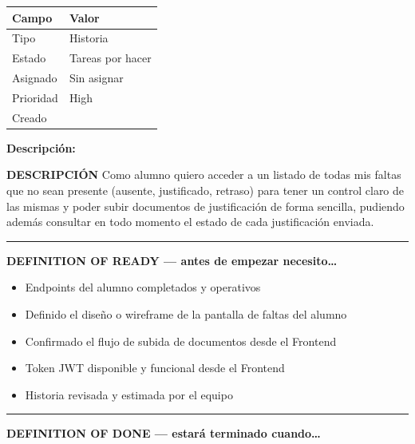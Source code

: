 \documentclass[
  spanish,
  11pt,
]{report}
\newcounter{none} %
\providecommand{\tightlist}{%
  \setlength{\itemsep}{0pt}\setlength{\parskip}{0pt}}
\begin{document}
{\def\LTcaptype{none} %
\begin{longtable}[]{@{}ll@{}}
\toprule\noalign{}
Campo & Valor \\
\midrule\noalign{}
\endhead
\bottomrule\noalign{}
\endlastfoot
Tipo & Historia \\
Estado & Tareas por hacer \\
Asignado & Sin asignar \\
Prioridad & High \\
Creado & \\
\end{longtable}
}

\textbf{Descripción:}

\textbf{DESCRIPCIÓN} Como alumno quiero acceder a un listado de todas
mis faltas que no sean presente (ausente, justificado, retraso) para
tener un control claro de las mismas y poder subir documentos de
justificación de forma sencilla, pudiendo además consultar en todo
momento el estado de cada justificación enviada.

\begin{center}\rule{0.5\linewidth}{0.5pt}\end{center}

\textbf{DEFINITION OF READY --- antes de empezar necesito\ldots{}}

\begin{itemize}
\tightlist
\item
  Endpoints del alumno completados y operativos
\item
  Definido el diseño o wireframe de la pantalla de faltas del alumno
\item
  Confirmado el flujo de subida de documentos desde el Frontend
\item
  Token JWT disponible y funcional desde el Frontend
\item
  Historia revisada y estimada por el equipo
\end{itemize}

\begin{center}\rule{0.5\linewidth}{0.5pt}\end{center}

\textbf{DEFINITION OF DONE --- estará terminado cuando\ldots{}}
\end{document}
